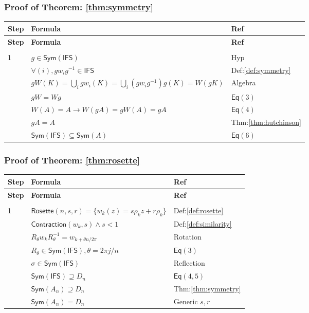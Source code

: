 \documentclass[10pt]{amsart}
\newcommand{\br}{,\allowbreak}
\newcommand{\Forall}{\forall}
\newenvironment{prooftable}{%
	\renewcommand{\arraystretch}{1.2}%
	\setlength{\tabcolsep}{4pt}%
	\setlength{\arrayrulewidth}{0.05pt}
	\fontsize{6}{7.5}\selectfont
	\sloppy
	\begin{longtable}{
			|>{\centering\arraybackslash}m{0.7cm}|
			>{\raggedright\centering\arraybackslash}m{0.70\textwidth}|
			>{\centering\arraybackslash}m{3.5cm}|
		}%
		\hline
		\textbf{Step} & \centering\textbf{Formula} & \textbf{Ref} \\
		\hline
		\endfirsthead
		\hline
		\textbf{Step} & \centering\textbf{Formula} & \textbf{Ref} \\
		\hline
		\endhead
		\hline
		\multicolumn{3}{r}{\textit{Continued on next page}} \\
		\endfoot
		\hline
		\endlastfoot
	}{%
	\end{longtable}%
}
\theoremstyle{break}
\begin{document}
\subsubsection*{Proof of Theorem: \ref{thm:symmetry}}
\begin{prooftable}
	1 & $g \in \mathsf{Sym}(\mathsf{IFS})$ & Hyp \\
	\hline
	2 & $\Forall (i) \br g w_i g^{-1} \in \mathsf{IFS}$ & Def:\ref{def:symmetry} \\
	\hline
	3 & $g W(K) = \bigcup_i g w_i(K) = \bigcup_i (g w_i g^{-1}) g(K) = W(g K)$ & Algebra \\
	\hline
	4 & $g W = W g$ & $\mathsf{Eq}(3)$ \\
	\hline
	5 & $W(A) = A \to W(gA) = g W(A) = gA$ & $\mathsf{Eq}(4)$ \\
	\hline
	6 & $gA = A$ & Thm:\ref{thm:hutchinson} \\
	\hline
	7 & $\mathsf{Sym}(\mathsf{IFS}) \subseteq \mathsf{Sym}(A)$ & $\mathsf{Eq}(6)$ \\
\end{prooftable}

\subsubsection*{Proof of Theorem: \ref{thm:rosette}}
\begin{prooftable}
	1 & $\mathsf{Rosette}(n \br s \br r) = \{w_k(z) = s \rho_k z + r \rho_k\}$ & Def:\ref{def:rosette} \\
	\hline
	2 & $\mathsf{Contraction}(w_k \br s) \land s < 1$ & Def:\ref{def:similarity} \\
	\hline
	3 & $R_\theta w_k R_\theta^{-1} = w_{k + \theta n / 2\pi}$ & Rotation \\
	\hline
	4 & $R_\theta \in \mathsf{Sym}(\mathsf{IFS}) \br \theta = 2\pi j / n$ & $\mathsf{Eq}(3)$ \\
	\hline
	5 & $\sigma \in \mathsf{Sym}(\mathsf{IFS})$ & Reflection \\
	\hline
	6 & $\mathsf{Sym}(\mathsf{IFS}) \supseteq D_n$ & $\mathsf{Eq}(4,5)$ \\
	\hline
	7 & $\mathsf{Sym}(A_n) \supseteq D_n$ & Thm:\ref{thm:symmetry} \\
	\hline
	8 & $\mathsf{Sym}(A_n) = D_n$ & Generic $s \br r$ \\
\end{prooftable}
\end{document}
